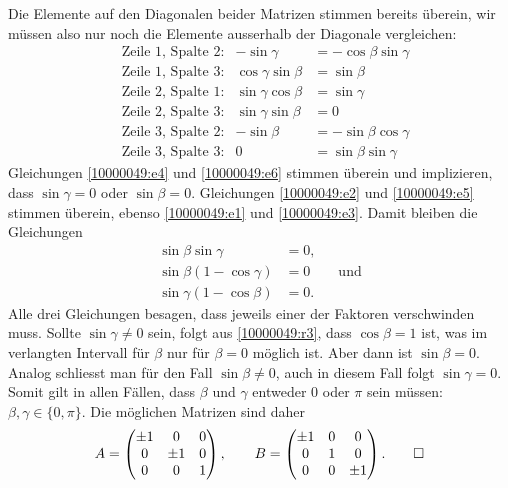 \begin{loesung}
\begin{teilaufgaben}
Die Elemente auf den Diagonalen beider Matrizen stimmen bereits
überein, wir müssen also nur noch die Elemente ausserhalb der
Diagonale vergleichen:
\begin{align}
&\text{Zeile $1$, Spalte $2$:}
&
-\sin\gamma&=-\cos\beta\sin\gamma
\label{10000049:e1}
\\
&\text{Zeile $1$, Spalte $3$:}
&
\cos\gamma\sin\beta&=\sin\beta
\label{10000049:e2}
\\
&\text{Zeile $2$, Spalte $1$:}
&
\sin\gamma\cos\beta&=\sin\gamma
\label{10000049:e3}
\\
&\text{Zeile $2$, Spalte $3$:}
&
\sin\gamma\sin\beta&=0
\label{10000049:e4}
\\
&\text{Zeile $3$, Spalte $2$:}
&
-\sin\beta&=-\sin\beta\cos\gamma
\label{10000049:e5}
\\
&\text{Zeile $3$, Spalte $3$:}
&
0&=\sin\beta\sin\gamma
\label{10000049:e6}
\end{align}
Gleichungen
\eqref{10000049:e4}
und
\eqref{10000049:e6}
stimmen überein und implizieren, dass $\sin\gamma=0$ oder $\sin\beta=0$.
Gleichungen
\eqref{10000049:e2}
und
\eqref{10000049:e5}
stimmen überein, ebenso
\eqref{10000049:e1}
und
\eqref{10000049:e3}.
Damit bleiben die Gleichungen
\begin{align}
\sin\beta   \sin\gamma &=0, \label{10000049:r1}\\
\sin\beta(1-\cos\gamma)&=0\qquad\text{und} \label{10000049:r2}\\
\sin\gamma(1-\cos\beta)&=0.\label{10000049:r3}
\end{align}
Alle drei Gleichungen besagen, dass jeweils einer der Faktoren verschwinden
muss.
Sollte $\sin\gamma\ne0$ sein, folgt aus \eqref{10000049:r3}, dass $\cos\beta=1$
ist, was im verlangten Intervall für $\beta$ nur für $\beta=0$  möglich ist.
Aber dann ist $\sin\beta=0$.
Analog schliesst man für den Fall $\sin\beta\ne 0$, auch in diesem Fall folgt
$\sin\gamma=0$.
Somit gilt in allen Fällen, dass $\beta$ und $\gamma$ entweder $0$ oder
$\pi$ sein müssen: $\beta,\gamma\in\{0,\pi\}$.
Die möglichen Matrizen sind daher
\[
A=\begin{pmatrix}
\pm1&   0&0\\
   0&\pm1&0\\
   0&   0&1
\end{pmatrix},
\qquad
B=\begin{pmatrix}
\pm1&0&   0\\
   0&1&   0\\
   0&0&\pm1
\end{pmatrix}.
\qedhere
\]
\end{teilaufgaben}
\end{loesung}


